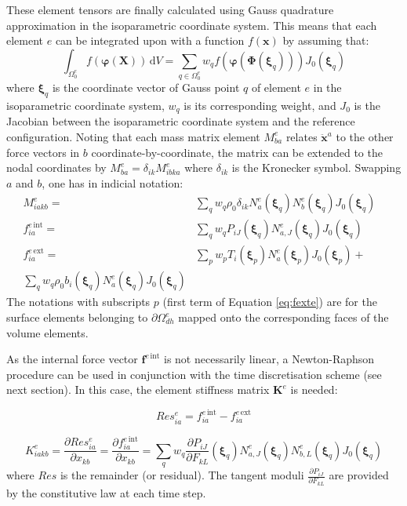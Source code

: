 \documentclass[oneside,11pt,times]{book}
\begin{document}
These element tensors are finally calculated using Gauss quadrature approximation in the isoparametric coordinate system. This means that each element $e$ can be integrated upon with a function $f(\bm{x})$ by assuming that:
\begin{equation} \label{eq:approxElem}
	\int_{\Omega_{0}^e} f(\bm{\varphi}(\bm{X})) \, \text{d} V = \sum_{q \in \Omega_{0}^e} w_q f(\bm{\varphi}(\bm{\Phi}(\bm{\xi}_q))) J_0(\bm{\xi}_q)
\end{equation}
where $\bm{\xi}_q$ is the coordinate vector of Gauss point $q$ of element $e$ in the isoparametric coordinate system, $w_q$ is its corresponding weight, and $J_0$ is the Jacobian between the isoparametric coordinate system and the reference configuration. Noting that each mass matrix element $M^{e}_{ba}$ relates $\ddot{\bm{x}}^a$  to the other force vectors in $b$ coordinate-by-coordinate, the matrix can be extended to the nodal coordinates by $M^{e}_{ba}=\delta_{ik}M^{e}_{ibka}$ where $\delta_{ik}$ is the Kronecker symbol. Swapping $a$ and $b$, one has in indicial notation:
%
\begin{eqnarray}
M_{iakb}^e =& \sum_q w_q \rho_0 \delta_{ik} N^e_{a}(\bm{\xi}_q) N^e_{b}(\bm{\xi}_q) J_0(\bm{\xi}_q) & \label{eq:Meab} \\
f_{ia}^{e\, \text{int}} =& \sum_q w_q  P_{iJ}(\bm{\xi}_q) N^e_{a,J}(\bm{\xi}_q) J_0(\bm{\xi}_q)  & \label{eq:finte} \\
f_{ia}^{e\,\text{ext}} =& \sum_p w_p T_{i}(\bm{\xi}_p) N^e_{a}(\bm{\xi}_p)  J_0(\bm{\xi}_p)+\\\sum_q w_q \rho_0 b_{i}(\bm{\xi}_q) N^e_{a}(\bm{\xi}_q)  J_0(\bm{\xi}_q) & \label{eq:fexte}
\end{eqnarray}
The notations with subscripts $p$ (first term of Equation \eqref{eq:fexte}) are for the surface elements belonging to  $\partial \Omega_{dh}^e$ mapped onto the corresponding faces of the volume elements.

As the internal force vector $\bm{f}^{e\,\text{int}}$ is not necessarily linear, a Newton-Raphson procedure can be used in conjunction with the time discretisation scheme (see next section). In this case, the element stiffness matrix $\bm{K}^e$ is needed:

\begin{equation}
\label{eq:Reseia}
Res_{ia}^e = f_{ia}^{e\,\text{int}} - f_{ia}^{e\,\text{ext}}
\end{equation}

\begin{equation}
\label{eq:Keiakb}
K_{iakb}^e = \frac{\partial Res_{ia}^e}{\partial x_{kb}}= \frac{\partial f_{ia}^{e\,\text{int}}}{\partial x_{kb}}= \sum_q w_q  \frac{\partial P_{iJ}}{\partial F_{kL}}(\bm{\xi}_q) N^e_{a,J}(\bm{\xi}_q) N^e_{b,L}(\bm{\xi}_q) J_0(\bm{\xi}_q)
\end{equation}
where $Res$ is the remainder (or residual). The tangent moduli $\frac{\partial P_{iJ}}{\partial F_{kL}}$ are provided by the constitutive law at each time step.\\
\end{document}

